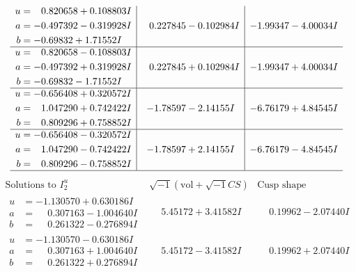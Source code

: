 \documentclass[1p]{elsarticle_modified}
\theoremstyle{definition}
\newcommand{\I}{\sqrt{-1}}
\begin{document}
$$\begin{array}{c|c|c}
\begin{aligned}
u &= \phantom{-}0.820658 + 0.108803 I \\
a &= -0.497392 - 0.319928 I \\
b &= -0.69832 + 1.71552 I\end{aligned}
 & \phantom{-}0.227845 - 0.102984 I & -1.99347 - 4.00034 I \\ \hline\begin{aligned}
u &= \phantom{-}0.820658 - 0.108803 I \\
a &= -0.497392 + 0.319928 I \\
b &= -0.69832 - 1.71552 I\end{aligned}
 & \phantom{-}0.227845 + 0.102984 I & -1.99347 + 4.00034 I \\ \hline\begin{aligned}
u &= -0.656408 + 0.320572 I \\
a &= \phantom{-}1.047290 + 0.742422 I \\
b &= \phantom{-}0.809296 + 0.758852 I\end{aligned}
 & -1.78597 - 2.14155 I & -6.76179 + 4.84545 I \\ \hline\begin{aligned}
u &= -0.656408 - 0.320572 I \\
a &= \phantom{-}1.047290 - 0.742422 I \\
b &= \phantom{-}0.809296 - 0.758852 I\end{aligned}
 & -1.78597 + 2.14155 I & -6.76179 - 4.84545 I\\
 \hline 
 \end{array}$$\newpage$$\begin{array}{c|c|c}  
\text{Solutions to }I^u_{2}& \I (\text{vol} + \sqrt{-1}CS) & \text{Cusp shape}\\
 \hline 
\begin{aligned}
u &= -1.130570 + 0.630186 I \\
a &= \phantom{-}0.307163 - 1.004640 I \\
b &= \phantom{-}0.261322 - 0.276894 I\end{aligned}
 & \phantom{-}5.45172 + 3.41582 I & \phantom{-}0.19962 - 2.07440 I \\ \hline\begin{aligned}
u &= -1.130570 - 0.630186 I \\
a &= \phantom{-}0.307163 + 1.004640 I \\
b &= \phantom{-}0.261322 + 0.276894 I\end{aligned}
 & \phantom{-}5.45172 - 3.41582 I & \phantom{-}0.19962 + 2.07440 I \\ \hline\begin{aligned}

\end{aligned}
\end{array}$$
\end{document}
